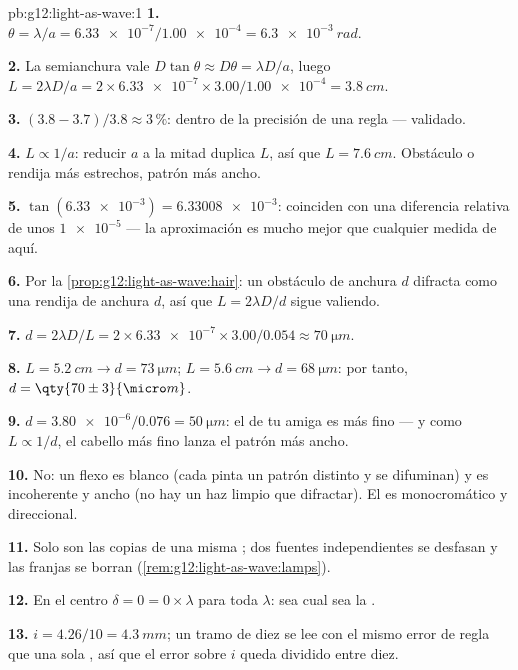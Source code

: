 \begin{solution}{pb:g12:light-as-wave:1}
\textbf{1.} $\theta = \lambda/a = \num{6.33e-7}/\num{1.00e-4} =
\qty{6.3e-3}{rad}$.

\textbf{2.} La semianchura vale
$D\tan\theta \approx D\theta = \lambda D/a$, luego
$L = 2\lambda D/a = 2 \times \num{6.33e-7} \times
3.00/\num{1.00e-4} = \qty{3.8}{cm}$.

\textbf{3.} $(3.8 - 3.7)/3.8 \approx 3\,\%$: dentro de la precisión de una
regla --- validado.

\textbf{4.} $L \propto 1/a$: reducir $a$ a la mitad duplica $L$, así que
$L = \qty{7.6}{cm}$. Obstáculo o rendija más estrechos, patrón más
ancho.

\textbf{5.} $\tan(\num{6.33e-3}) = \num{6.33008e-3}$: coinciden con una
diferencia relativa de unos $\num{1e-5}$ --- la aproximación es mucho
mejor que cualquier medida de aquí.

\textbf{6.} Por la \cref{prop:g12:light-as-wave:hair}: un obstáculo de
anchura $d$ difracta como una rendija de anchura $d$, así que
$L = 2\lambda D/d$ sigue valiendo.

\textbf{7.} $d = 2\lambda D/L = 2 \times \num{6.33e-7} \times
3.00/0.054 \approx \qty{70}{\micro m}$.

\textbf{8.} $L = \qty{5.2}{cm} \to d = \qty{73}{\micro m}$;
$L = \qty{5.6}{cm} \to d = \qty{68}{\micro m}$: por tanto,
$d = \qty{70 \pm 3}{\micro m}$.

\textbf{9.} $d = \num{3.80e-6}/0.076 = \qty{50}{\micro m}$: el de tu
amiga es más fino --- y como $L \propto 1/d$, el cabello más fino lanza
el patrón más ancho.

\textbf{10.} No: un flexo es blanco (cada  pinta un
patrón distinto y se difuminan) y es incoherente y ancho (no hay un haz
limpio que difractar). El  es monocromático y direccional.

\textbf{11.} Solo son  las copias de una misma ; dos
fuentes independientes se desfasan y las franjas se borran
(\cref{rem:g12:light-as-wave:lamps}).

\textbf{12.} En el centro $\delta = 0 = 0 \times \lambda$ para toda
$\lambda$:  sea cual sea la .

\textbf{13.} $i = 4.26/10 = \qty{4.3}{mm}$; un tramo de diez se lee con
el mismo error de regla que una sola , así que el error sobre
$i$ queda dividido entre diez.


\end{solution}
